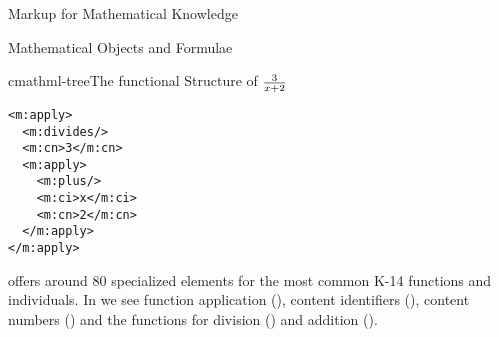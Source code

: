 \begin{omgroup}[id=math-markup]{Markup for Mathematical Knowledge}
\begin{omgroup}[id=math-objects]{Mathematical Objects and Formulae}
\begin{omgroup}[id=math-markup.mathml]{\mathml}
\begin{myfig}{cmathml-tree}{The functional Structure of $3\over x+2$}
\begin{minipage}{3cm}
\begin{lstlisting}[numbers=none,frame=none]
<m:apply>
  <m:divides/>
  <m:cn>3</m:cn>
  <m:apply>
    <m:plus/>
    <m:ci>x</m:ci>
    <m:cn>2</m:cn>
  </m:apply>
</m:apply>
\end{lstlisting}
\end{minipage}\hspace*{3em}
\begin{minipage}{4cm}
\end{minipage}
\end{myfig}

{\cmathml} offers around 80 specialized elements for the most common K-14 functions and
individuals. In {} we see function application
({}), content identifiers ({}), content
numbers ({}) and the functions for division
({}) and addition ({}).


\end{omgroup}
\end{omgroup}
\end{omgroup}
